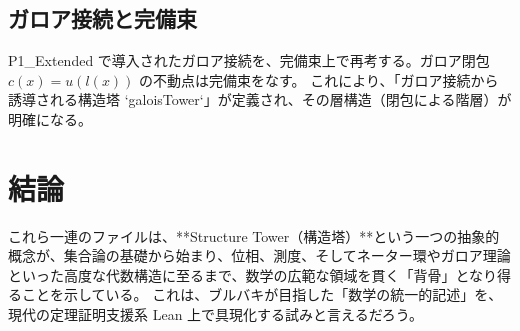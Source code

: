 \documentclass[a4paper,11pt]{ltjsarticle}
\theoremstyle{definition}
\begin{document}
\subsection{ガロア接続と完備束}
P1\_Extended で導入されたガロア接続を、完備束上で再考する。ガロア閉包 $c(x) = u(l(x))$ の不動点は完備束をなす。
これにより、「ガロア接続から誘導される構造塔 `galoisTower`」が定義され、その層構造（閉包による階層）が明確になる。

\section{結論}

これら一連のファイルは、**Structure Tower（構造塔）**という一つの抽象的概念が、集合論の基礎から始まり、位相、測度、そしてネーター環やガロア理論といった高度な代数構造に至るまで、数学の広範な領域を貫く「背骨」となり得ることを示している。
これは、ブルバキが目指した「数学の統一的記述」を、現代の定理証明支援系 Lean 上で具現化する試みと言えるだろう。
\end{document}
